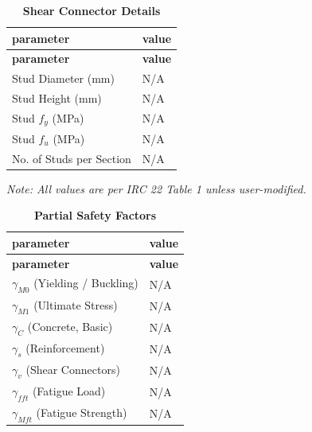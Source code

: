 \documentclass[12pt,a4paper]{report}
\numberwithin{table}{chapter}
\numberwithin{figure}{chapter}
\newcommand{\ReportTableSetup}{%
  \setlength{\tabcolsep}{3.0pt}%
  \renewcommand{\arraystretch}{1.18}%
  \setlength{\arrayrulewidth}{0.4pt}\setlength{\extrarowheight}{0.5pt}%
  \setlength{\LTleft}{\fill}\setlength{\LTright}{\fill}%
  \setlength{\LTpre}{4pt}\setlength{\LTpost}{8pt}}
\newcommand{\ReportTableFont}{\small}
\newcommand{\ReportRowGap}{3.0pt}
\newcommand{\ReportTableGap}{\vspace{0.5em}}
\begin{document}
\ReportTableGap
\begingroup
\ReportTableSetup
\ReportTableFont
\begin{longtable}{|L{5.5000cm}|p{10.0000cm}|}
\caption{\textbf{Shear Connector Details}}\\
\hline
\textbf{parameter} & \textbf{value} \\
\hline
\endfirsthead
\hline
\textbf{parameter} & \textbf{value} \\
\hline
\endhead
\hline
\endfoot
\hline
\endlastfoot

\textnormal{Stud Diameter (mm)} & N/A \\[\ReportRowGap]
\hline
\textnormal{Stud Height (mm)} & N/A \\[\ReportRowGap]
\hline
\textnormal{Stud $f_y$ (MPa)} & N/A \\[\ReportRowGap]
\hline
\textnormal{Stud $f_u$ (MPa)} & N/A \\[\ReportRowGap]
\hline
\textnormal{No. of Studs per Section} & N/A \\[\ReportRowGap]
\hline
\end{longtable}
\endgroup



\label{subsec:safety-factors}

\ReportTableGap

\ReportTableGap
\noindent\textit{Note: All values are per IRC 22 Table 1 unless user-modified.}

\ReportTableGap
\begingroup
\ReportTableSetup
\ReportTableFont
\begin{longtable}{|L{5.5000cm}|p{10.0000cm}|}
\caption{\textbf{Partial Safety Factors}}\\
\hline
\textbf{parameter} & \textbf{value} \\
\hline
\endfirsthead
\hline
\textbf{parameter} & \textbf{value} \\
\hline
\endhead
\hline
\endfoot
\hline
\endlastfoot

\textnormal{$\gamma_{M0}$ (Yielding / Buckling)} & N/A \\[\ReportRowGap]
\hline
\textnormal{$\gamma_{M1}$ (Ultimate Stress)} & N/A \\[\ReportRowGap]
\hline
\textnormal{$\gamma_C$ (Concrete, Basic)} & N/A \\[\ReportRowGap]
\hline
\textnormal{$\gamma_s$ (Reinforcement)} & N/A \\[\ReportRowGap]
\hline
\textnormal{$\gamma_v$ (Shear Connectors)} & N/A \\[\ReportRowGap]
\hline
\textnormal{$\gamma_{fft}$ (Fatigue Load)} & N/A \\[\ReportRowGap]
\hline
\textnormal{$\gamma_{Mft}$ (Fatigue Strength)} & N/A \\[\ReportRowGap]
\hline
\end{longtable}
\endgroup
\end{document}
